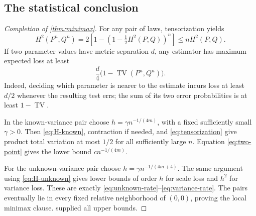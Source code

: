 \documentclass[11pt,a4paper]{article}
\numberwithin{equation}{section}
\theoremstyle{definition}
\theoremstyle{remark}
\DeclareMathOperator{\TV}{TV}
\begin{document}
\subsection{The statistical conclusion}
\begin{proof}[Completion of \cref{thm:minimax}]
For any pair of laws, tensorization yields
\begin{equation}
 H^2(P^n,Q^n)=2\left[1-\left(1-\tfrac12H^2(P,Q)\right)^n\right]
 \le nH^2(P,Q).
 \label{eq:tensorization}
\end{equation}
If two parameter values have metric separation $d$, any estimator has
maximum expected loss at least
\begin{equation}
 \frac d4\bigl(1-\TV(P^n,Q^n)\bigr).
 \label{eq:two-point}
\end{equation}
Indeed, deciding which parameter is nearer to the estimate incurs loss at
least $d/2$ whenever the resulting test errs; the sum of its two error
probabilities is at least $1-\TV$.

In the known-variance pair choose $h=\gamma n^{-1/(4m)}$, with a fixed
sufficiently small $\gamma>0$. Then \eqref{eq:H-known}, contraction if
needed, and \eqref{eq:tensorization} give product total variation at most
$1/2$ for all sufficiently large $n$. Equation \eqref{eq:two-point} gives
the lower bound $cn^{-1/(4m)}$.

For the unknown-variance pair choose
$h=\gamma n^{-1/(4m+4)}$. The same argument using
\eqref{eq:H-unknown} gives lower bounds of order $h$ for scale loss and
$h^2$ for variance loss. These are exactly
\eqref{eq:unknown-rate}--\eqref{eq:variance-rate}. The pairs eventually
lie in every fixed relative neighborhood of $(0,0)$, proving the local
minimax clause.  supplied all upper bounds.
\end{proof}
\end{document}
